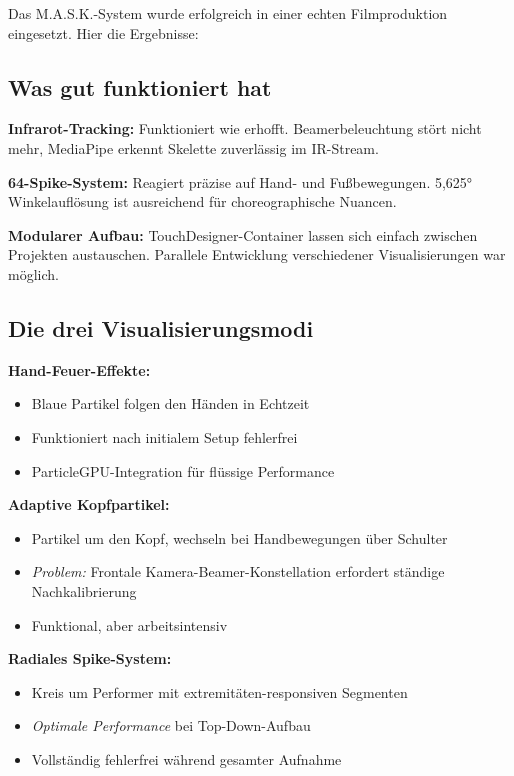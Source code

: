 
Das M.A.S.K.-System wurde erfolgreich in einer echten Filmproduktion eingesetzt. Hier die Ergebnisse:

\subsection{Was gut funktioniert hat}

\textbf{Infrarot-Tracking:} Funktioniert wie erhofft. Beamerbeleuchtung stört nicht mehr, MediaPipe erkennt Skelette zuverlässig im IR-Stream.

\textbf{64-Spike-System:} Reagiert präzise auf Hand- und Fußbewegungen. 5,625° Winkelauflösung ist ausreichend für choreographische Nuancen.

\textbf{Modularer Aufbau:} TouchDesigner-Container lassen sich einfach zwischen Projekten austauschen. Parallele Entwicklung verschiedener Visualisierungen war möglich.

\subsection{Die drei Visualisierungsmodi}

\textbf{Hand-Feuer-Effekte:}
\begin{itemize}
    \item Blaue Partikel folgen den Händen in Echtzeit
    \item Funktioniert nach initialem Setup fehlerfrei
    \item ParticleGPU-Integration für flüssige Performance
\end{itemize}

\textbf{Adaptive Kopfpartikel:}
\begin{itemize}
    \item Partikel um den Kopf, wechseln bei Handbewegungen über Schulter
    \item \textit{Problem:} Frontale Kamera-Beamer-Konstellation erfordert ständige Nachkalibrierung
    \item Funktional, aber arbeitsintensiv
\end{itemize}

\textbf{Radiales Spike-System:}
\begin{itemize}
    \item Kreis um Performer mit extremitäten-responsiven Segmenten
    \item \textit{Optimale Performance} bei Top-Down-Aufbau
    \item Vollständig fehlerfrei während gesamter Aufnahme
\end{itemize}

